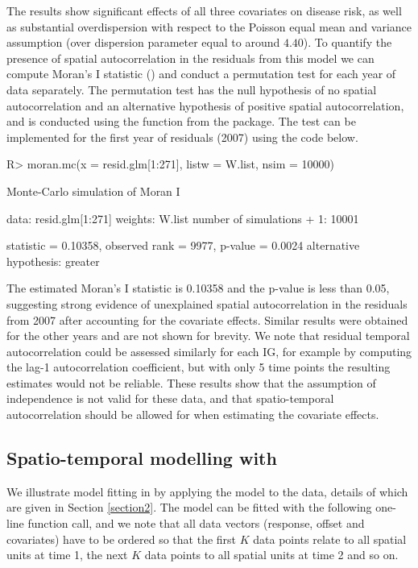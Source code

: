 \documentclass[article, nojss]{jss}
\begin{document}
The results show significant effects of all three covariates on disease risk, as well as substantial overdispersion with respect to the Poisson equal mean and variance assumption (over dispersion parameter equal to around $4.40$). To quantify the presence of spatial autocorrelation in the residuals from this model we can compute Moran's I statistic (\citealp{moran1950}) and conduct a permutation test for each year of data separately. The permutation test has the null hypothesis of no spatial autocorrelation and an alternative hypothesis of positive spatial autocorrelation, and is conducted using the  function from the  package. The test can be implemented for the first year of residuals (2007) using the code below.

\begin{Schunk}
\begin{Sinput}
R>  moran.mc(x = resid.glm[1:271], listw = W.list, nsim = 10000)
\end{Sinput}
\begin{Soutput}
	Monte-Carlo simulation of Moran I

data:  resid.glm[1:271] 
weights: W.list  
number of simulations + 1: 10001 

statistic = 0.10358, observed rank = 9977, p-value = 0.0024
alternative hypothesis: greater
\end{Soutput}
\end{Schunk}

The estimated Moran's I statistic is 0.10358 and the p-value is less than 0.05, suggesting strong evidence of unexplained spatial autocorrelation in the residuals from 2007 after accounting for the covariate effects. Similar results were obtained for the other years and are not shown for brevity. We note that residual temporal autocorrelation could be assessed similarly for each IG, for example by computing the lag-1 autocorrelation coefficient, but with only 5 time points the resulting estimates would not be reliable. These results show that the assumption of independence is not valid for these data, and that spatio-temporal autocorrelation should be allowed for when estimating the covariate effects. 


\subsection[Spatio-temporal modelling with CARBayesST]{Spatio-temporal modelling with }
We illustrate model fitting in  by applying the  model to the data, details of which are given in Section \ref{section2}. The model can be fitted with the following one-line function call, and we note that all data vectors (response, offset and covariates) have to be ordered so that the first $K$ data points relate to all spatial units at time 1, the next $K$ data points to all spatial units at time 2 and so on.
\end{document}
